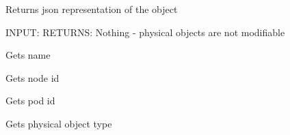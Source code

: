 \documentclass[letterpaper,10pt,english]{sphinxmanual}
\begin{document}
\begin{fulllineitems}

\begin{fulllineitems}
\label{aciphysobject:aciphysobject.BaseACIPhysObject.get_json}
Returns json representation of the object

INPUT:
RETURNS: Nothing - physical objects are not modifiable

\end{fulllineitems}


\begin{fulllineitems}
\label{aciphysobject:aciphysobject.BaseACIPhysObject.get_name}
Gets name

\end{fulllineitems}


\begin{fulllineitems}
\label{aciphysobject:aciphysobject.BaseACIPhysObject.get_node}
Gets node id

\end{fulllineitems}


\begin{fulllineitems}
\label{aciphysobject:aciphysobject.BaseACIPhysObject.get_pod}
Gets pod id

\end{fulllineitems}


\begin{fulllineitems}
\label{aciphysobject:aciphysobject.BaseACIPhysObject.get_serial}
\end{fulllineitems}


\begin{fulllineitems}
\label{aciphysobject:aciphysobject.BaseACIPhysObject.get_type}
Gets physical object type


\end{fulllineitems}
\end{fulllineitems}
\end{document}
